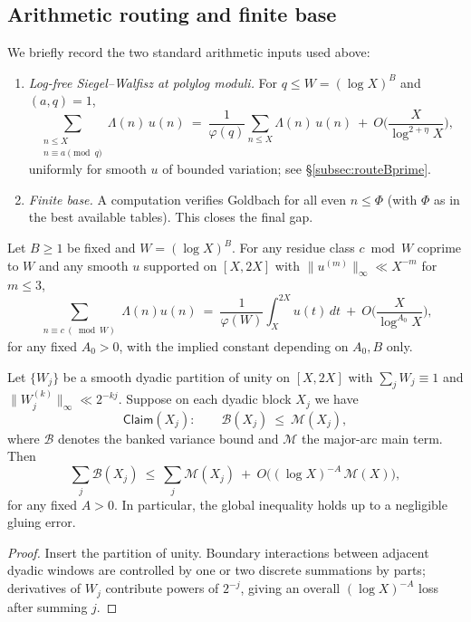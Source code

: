 \subsection{Arithmetic routing and finite base}
\label{sec:finite-base}
We briefly record the two standard arithmetic inputs used above:
\begin{enumerate}[label=(\alph*)]
\item \emph{Log-free Siegel--Walfisz at polylog moduli.} For $q\le W=(\log X)^B$ and $(a,q)=1$,
\[
\sum_{\substack{n\le X\\ n\equiv a\!\!\!\pmod q}} \Lambda(n)\,u(n)
\ =\ \frac{1}{\varphi(q)}\sum_{n\le X}\Lambda(n)\,u(n)\ +\ O\!\Big(\frac{X}{\log^{2+\eta}\!X}\Big),
\]
uniformly for smooth $u$ of bounded variation; see \S\ref{subsec:routeBprime}.
\item \emph{Finite base.} A computation verifies Goldbach for all even $n\le \Phi$ (with $\Phi$ as in the best available tables). This closes the final gap.
\end{enumerate}
\begin{lemma}\label{lem:SW-logfree}
Let $B\ge 1$ be fixed and $W=(\log X)^B$. For any residue class $c\bmod W$ coprime to $W$ and any smooth $u$ supported on $[X,2X]$ with $\|u^{(m)}\|_\infty\ll X^{-m}$ for $m\le 3$,
\[
\sum_{\substack{n\equiv c\ (\bmod W)}} \Lambda(n) u(n)\ =\ \frac{1}{\varphi(W)}\int_X^{2X} u(t)\,dt\ +\ O\Big(\frac{X}{\log^{A_0} X}\Big),
\]
for any fixed $A_0>0$, with the implied constant depending on $A_0,B$ only.
\end{lemma}

\begin{lemma}\label{lem:glue-tolerance}
Let $\{W_j\}$ be a smooth dyadic partition of unity on $[X,2X]$ with $\sum_j W_j\equiv 1$ and $\|W_j^{(k)}\|_\infty\ll 2^{-kj}$. Suppose on each dyadic block $X_j$ we have
\[
\mathsf{Claim}(X_j):\qquad \mathcal B(X_j)\ \le\ \mathcal M(X_j),
\]
where $\mathcal B$ denotes the banked variance bound and $\mathcal M$ the major-arc main term. Then
\[
\sum_j \mathcal B(X_j)\ \le\ \sum_j \mathcal M(X_j)\ +\ O\big((\log X)^{-A}\,\mathcal M(X)\big),
\]
for any fixed $A>0$. In particular, the global inequality holds up to a negligible gluing error.
\end{lemma}

\begin{proof}
Insert the partition of unity. Boundary interactions between adjacent dyadic windows are controlled by one or two discrete summations by parts; derivatives of $W_j$ contribute powers of $2^{-j}$, giving an overall $(\log X)^{-A}$ loss after summing $j$.
\end{proof}

